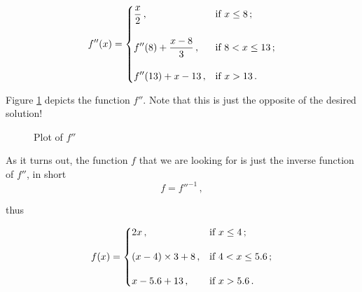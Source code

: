 \documentclass[a4paper,9pt]{article}
\begin{document}
    \begin{equation}
	    f''(x) = \begin{dcases}
		    \frac{x}{2}\,, & \text{if $x \leq 8\,;$}\\[1em]
		    f''(8)+\frac{x-8}{3}\,, & \text{if $8 < x \leq 13\,;$}\\[1em]  
		    f''(13) + x- 13\,, & \text{if $x > 13\,.$}\\ 
	    \end{dcases}
	    \label{eq:beat2second}
    \end{equation}

    Figure \ref{fig:beat2second} depicts the function $f''$. Note that this is just the opposite of the desired solution!
    
\begin{figure}[htpb]
	\centering

	\caption{Plot of $f''$}
	\label{fig:beat2second}
\end{figure}

As it turns out, the function $f$ that we are looking for is just the inverse function of $f''$, in short
\begin{equation}
	f = f''^{-1}\,,
	\label{eq:inverse}
\end{equation}

thus

    \begin{equation}
    f(x) = \begin{dcases}
		    2x\,, & \text{if $x \leq 4\,;$}\\[1em]
		    (x-4)\times 3 + 8\,, & \text{if $4 < x \leq 5.6\,;$}\\[1em]  
		    x-5.6 + 13\,, & \text{if $x > 5.6\,.$}\\ 
	    \end{dcases}
	    \label{eq:beat2second}
    \end{equation}
    
\end{document}
